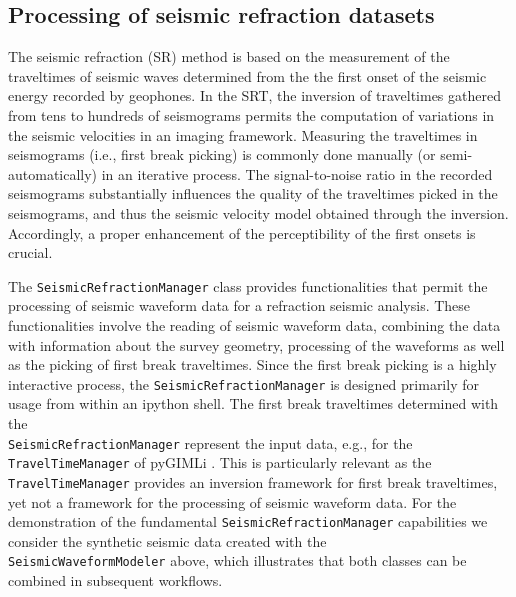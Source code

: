 \documentclass[a4paper,fleqn]{cas-sc}
\begin{document}
\subsection{Processing of seismic refraction datasets}

The seismic refraction (SR) method is based on the measurement of the traveltimes of seismic waves determined from the the first onset of the seismic energy recorded by geophones. In the SRT, the inversion of traveltimes gathered from tens to hundreds of seismograms permits the computation of variations in the seismic velocities in an imaging framework. Measuring the traveltimes in seismograms (i.e., first break picking) is commonly done manually (or semi-automatically) in an iterative process. The signal-to-noise ratio in the recorded seismograms substantially influences the quality of the traveltimes picked in the seismograms, and thus the seismic velocity model obtained through the inversion. Accordingly, a proper enhancement of the perceptibility of the first onsets is crucial.

The \texttt{SeismicRefractionManager} class provides functionalities that permit the processing of seismic waveform data for a refraction seismic analysis. These functionalities involve the reading of seismic waveform data, combining the data with information about the survey geometry, processing of the waveforms as well as the picking of first break traveltimes. Since the first break picking is a highly interactive process, the \texttt{SeismicRefractionManager} is designed primarily for usage from within an ipython shell. The first break traveltimes determined with the\\ \texttt{SeismicRefractionManager} represent the input data, e.g., for the \texttt{TravelTimeManager} of pyGIMLi \citep{ruecker2017}. This is particularly relevant as the \texttt{TravelTimeManager} provides an inversion framework for first break traveltimes, yet not a framework for the processing of seismic waveform data.
For the demonstration of the fundamental \texttt{SeismicRefractionManager} capabilities we consider the synthetic seismic data created with the\\ \texttt{SeismicWaveformModeler} above, which illustrates that both classes can be combined in subsequent workflows. 
\end{document}
